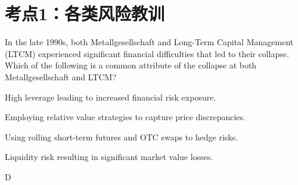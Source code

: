 \documentclass{article}
\newcounter{question} %
\begin{document}
 \tableofcontents %
\newpage




\iftrue
\section{考点1：各类风险教训}
\setcounter{question}{0}


\begin{question}
    In the late 1990s, both Metallgesellschaft and Long-Term Capital Management (LTCM) experienced significant financial difficulties that led to their collapse. Which of the following is a common attribute of the collapse at both Metallgesellschaft and LTCM?
\end{question}


\begin{choices}
    \item High leverage leading to increased financial risk exposure.  
    \item Employing relative value strategies to capture price discrepancies.  
    \item Using rolling short-term futures and OTC swaps to hedge risks.  
    \item Liquidity risk resulting in significant market value losses.  
\end{choices}

\begin{correctanswer}
   D
\end{correctanswer}
\end{document}
